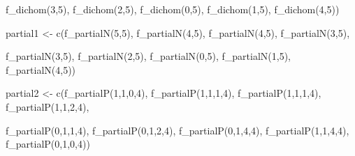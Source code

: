 \documentclass[
  letterpaper,
  DIV=11,
  numbers=noendperiod]{scrreprt}
\newenvironment{Shaded}{\begin{snugshade}}{\end{snugshade}}
\newcommand{\DecValTok}[1]{\textcolor[rgb]{0.68,0.00,0.00}{#1}}
\newcommand{\FunctionTok}[1]{\textcolor[rgb]{0.28,0.35,0.67}{#1}}
\newcommand{\NormalTok}[1]{\textcolor[rgb]{0.00,0.23,0.31}{#1}}
\newcommand{\OtherTok}[1]{\textcolor[rgb]{0.00,0.23,0.31}{#1}}
\begin{document}
\begin{Shaded}
\begin{Highlighting}[]
         \FunctionTok{f\_dichom}\NormalTok{(}\DecValTok{3}\NormalTok{,}\DecValTok{5}\NormalTok{), }
         \FunctionTok{f\_dichom}\NormalTok{(}\DecValTok{2}\NormalTok{,}\DecValTok{5}\NormalTok{),}
         \FunctionTok{f\_dichom}\NormalTok{(}\DecValTok{0}\NormalTok{,}\DecValTok{5}\NormalTok{),}
         \FunctionTok{f\_dichom}\NormalTok{(}\DecValTok{1}\NormalTok{,}\DecValTok{5}\NormalTok{),}
         \FunctionTok{f\_dichom}\NormalTok{(}\DecValTok{4}\NormalTok{,}\DecValTok{5}\NormalTok{))}

\NormalTok{partial1 }\OtherTok{\textless{}{-}} \FunctionTok{c}\NormalTok{(}\FunctionTok{f\_partialN}\NormalTok{(}\DecValTok{5}\NormalTok{,}\DecValTok{5}\NormalTok{), }
              \FunctionTok{f\_partialN}\NormalTok{(}\DecValTok{4}\NormalTok{,}\DecValTok{5}\NormalTok{), }
              \FunctionTok{f\_partialN}\NormalTok{(}\DecValTok{4}\NormalTok{,}\DecValTok{5}\NormalTok{), }
              \FunctionTok{f\_partialN}\NormalTok{(}\DecValTok{3}\NormalTok{,}\DecValTok{5}\NormalTok{), }
              
              \FunctionTok{f\_partialN}\NormalTok{(}\DecValTok{3}\NormalTok{,}\DecValTok{5}\NormalTok{), }
              \FunctionTok{f\_partialN}\NormalTok{(}\DecValTok{2}\NormalTok{,}\DecValTok{5}\NormalTok{),}
              \FunctionTok{f\_partialN}\NormalTok{(}\DecValTok{0}\NormalTok{,}\DecValTok{5}\NormalTok{),}
              \FunctionTok{f\_partialN}\NormalTok{(}\DecValTok{1}\NormalTok{,}\DecValTok{5}\NormalTok{),}
              \FunctionTok{f\_partialN}\NormalTok{(}\DecValTok{4}\NormalTok{,}\DecValTok{5}\NormalTok{))}

\NormalTok{partial2 }\OtherTok{\textless{}{-}} \FunctionTok{c}\NormalTok{(}\FunctionTok{f\_partialP}\NormalTok{(}\DecValTok{1}\NormalTok{,}\DecValTok{1}\NormalTok{,}\DecValTok{0}\NormalTok{,}\DecValTok{4}\NormalTok{), }
              \FunctionTok{f\_partialP}\NormalTok{(}\DecValTok{1}\NormalTok{,}\DecValTok{1}\NormalTok{,}\DecValTok{1}\NormalTok{,}\DecValTok{4}\NormalTok{), }
              \FunctionTok{f\_partialP}\NormalTok{(}\DecValTok{1}\NormalTok{,}\DecValTok{1}\NormalTok{,}\DecValTok{1}\NormalTok{,}\DecValTok{4}\NormalTok{), }
              \FunctionTok{f\_partialP}\NormalTok{(}\DecValTok{1}\NormalTok{,}\DecValTok{1}\NormalTok{,}\DecValTok{2}\NormalTok{,}\DecValTok{4}\NormalTok{), }
              
              \FunctionTok{f\_partialP}\NormalTok{(}\DecValTok{0}\NormalTok{,}\DecValTok{1}\NormalTok{,}\DecValTok{1}\NormalTok{,}\DecValTok{4}\NormalTok{),}
              \FunctionTok{f\_partialP}\NormalTok{(}\DecValTok{0}\NormalTok{,}\DecValTok{1}\NormalTok{,}\DecValTok{2}\NormalTok{,}\DecValTok{4}\NormalTok{),}
              \FunctionTok{f\_partialP}\NormalTok{(}\DecValTok{0}\NormalTok{,}\DecValTok{1}\NormalTok{,}\DecValTok{4}\NormalTok{,}\DecValTok{4}\NormalTok{),}
              \FunctionTok{f\_partialP}\NormalTok{(}\DecValTok{1}\NormalTok{,}\DecValTok{1}\NormalTok{,}\DecValTok{4}\NormalTok{,}\DecValTok{4}\NormalTok{), }
              \FunctionTok{f\_partialP}\NormalTok{(}\DecValTok{0}\NormalTok{,}\DecValTok{1}\NormalTok{,}\DecValTok{0}\NormalTok{,}\DecValTok{4}\NormalTok{))}


\end{Highlighting}
\end{Shaded}
\end{document}

